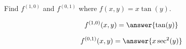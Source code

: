 \documentclass{ximera}
\author{David Guichard \and Neal Koblitz \and H. Jerome Keisler \and Albert Scheller \and Barry Balof \and Mike Wills \and Matthew Carr}
\begin{document}
\begin{exercise}




Find $f^{(1,0)}$ and $f^{(0,1)}$ where $f(x,y)=x\tan(y)$.

\begin{prompt}
\[
f^{(1,0)}(x,y)=\answer{\tan(y)}
\]
\end{prompt}

\begin{prompt}
\[
f^{(0,1)}(x,y)=\answer{x\sec^{2}(y)}
\]
\end{prompt}

\end{exercise}
\end{document}

